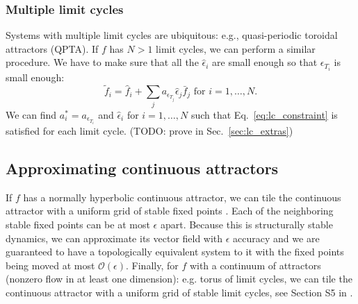 \documentclass{article}
\newcommand{\ascomment}[1]{\textcolor{ascolor}{(#1)}}
\theoremstyle{definition} \newtheorem{definition}{Definition}
\theoremstyle{remark} \newtheorem{remark}{Remark}
\newcounter{ct}
\begin{document}
\subsubsection{Multiple limit cycles}
Systems with multiple limit cycles are ubiquitous: e.g., quasi-periodic toroidal attractors (QPTA)\citep{Park2023a}.
%
If $f$ has $N>1$ limit cycles, we can perform a similar procedure.
We have to make sure that all the $\hat{\epsilon}_i$ are small enough so that $\epsilon_{T_i}$ is small enough:
\begin{equation}\label{eq:nlc_vfs}
\tilde f_i = \hat{f}_i + \sum_{j}a_{\epsilon_{T_j}}\hat{\epsilon}_j\bar{f}_j \text{ for } i=1,\dots, N.
\end{equation}
We can find $a_i^* = a_{\epsilon_{T_i}}$ and $\hat\epsilon_i$ for $i=1,\dots,N$ such that Eq.~\ref{eq:lc_constraint} is satisfied for each limit cycle.
\ascomment{TODO: prove in Sec.~\ref{sec:lc_extras}}




\subsection{Approximating continuous attractors}\label{sec:ca_theorem}

If $f$ has a normally hyperbolic continuous attractor, we can tile the continuous attractor with a uniform grid of stable fixed points \citep{Sagodi2024a}.
Each of the neighboring stable fixed points can be at most $\epsilon$ apart. %
Because this is structurally stable dynamics,  we can approximate its vector field with $\epsilon$ accuracy and we are guaranteed to have a topologically equivalent system to it with the fixed points being moved at most $\mathcal{O}(\epsilon)$. 
%
Finally, for $f$ with a continuum of attractors (nonzero flow in at least one dimension): e.g. torus of limit cycles, we can tile the continuous attractor with a uniform grid of stable limit cycles, see Section S5 in \citep{Sagodi2024a}.
\end{document}
